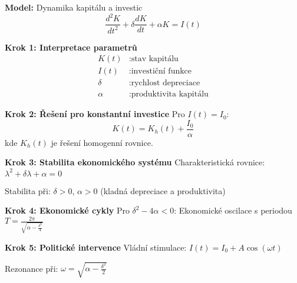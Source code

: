 \begin{example}
\label{ex:ekonomicke-modely}

\noindent\textbf{Model:} Dynamika kapitálu a investic
\[
\frac{d^2K}{dt^2} + \delta\frac{dK}{dt} + \alpha K = I(t)
\]

\vspace{1.5\baselineskip}

\noindent\textbf{Krok 1: Interpretace parametrů}
\begin{align*}
K(t) &: \text{stav kapitálu} \\
I(t) &: \text{investiční funkce} \\
\delta &: \text{rychlost depreciace} \\
\alpha &: \text{produktivita kapitálu}
\end{align*}

\vspace{1\baselineskip}

\noindent\textbf{Krok 2: Řešení pro konstantní investice}
Pro $I(t) = I_0$:
\[
K(t) = K_h(t) + \frac{I_0}{\alpha}
\]
kde $K_h(t)$ je řešení homogenní rovnice.

\vspace{1\baselineskip}

\noindent\textbf{Krok 3: Stabilita ekonomického systému}
Charakteristická rovnice: $\lambda^2 + \delta\lambda + \alpha = 0$

Stabilita při: $\delta > 0$, $\alpha > 0$ (kladná depreciace a produktivita)

\vspace{1\baselineskip}

\noindent\textbf{Krok 4: Ekonomické cykly}
Pro $\delta^2 - 4\alpha < 0$: Ekonomické oscilace s periodou $T = \frac{2\pi}{\sqrt{\alpha - \frac{\delta^2}{4}}}$

\vspace{1\baselineskip}

\noindent\textbf{Krok 5: Politické intervence}
Vládní stimulace: $I(t) = I_0 + A\cos(\omega t)$

Rezonance při: $\omega = \sqrt{\alpha - \frac{\delta^2}{2}}$

\end{example}

